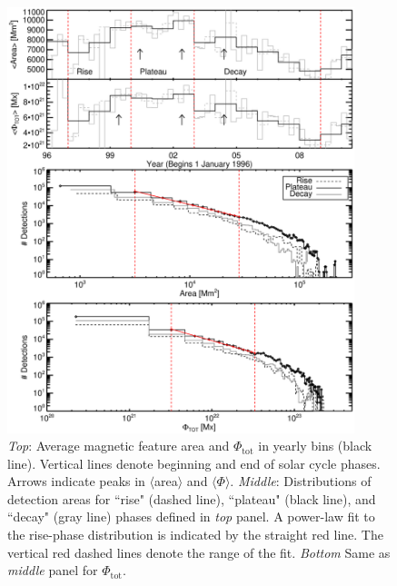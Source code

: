 \begin{figure}[!t]
\centerline{\includegraphics[width=0.9\textwidth,angle=0]{plot_2_phase_cycle_ar_prop.eps}}
\caption[The distribution of AR area and flux over the solar cycle.]{\emph{Top}: Average magnetic feature area and $\Phi_{\mathrm{tot}}$ in yearly bins (black line). Vertical lines denote beginning and end of solar cycle phases. Arrows indicate peaks in $\langle$area$\rangle$ and $\langle\Phi\rangle$. \emph{Middle}: Distributions of detection areas for ``rise" (dashed line), ``plateau" (black line), and ``decay" (gray line) phases defined in \emph{top} panel. A power-law fit to the rise-phase distribution is indicated by the straight red line. The vertical red dashed lines denote the range of the fit. \emph{Bottom} Same as \emph{middle} panel for $\Phi_{\mathrm{tot}}$.}
\label{plot_2_phase_cycle_ar_prop}
\end{figure}

